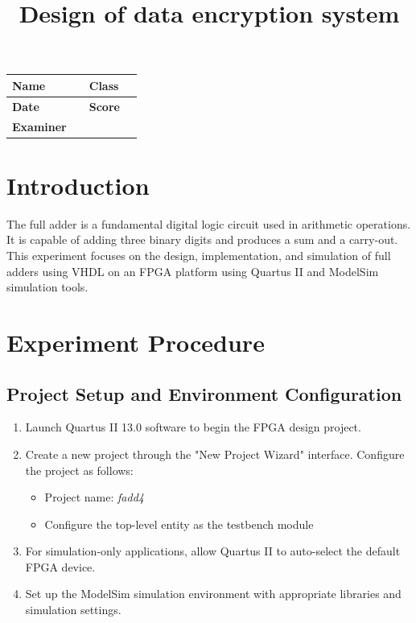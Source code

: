 \documentclass[]{article}
\begin{document}
\title{\huge Design of data encryption system}
\author{\large }
\date{}

\maketitle

\vspace{3cm}

\begin{center}
    {\large
        \begin{tabular}{|p{2.5cm}|p{3.5cm}|p{2.5cm}|p{3.5cm}|}
            \hline
            \textbf{Name}     &  & \textbf{Class} &       \\[0.8cm]
            \hline
            \textbf{Date}     &  & \textbf{Score} & \quad \\[0.8cm]
            \hline
            \textbf{Examiner} &  & \quad          & \quad \\[0.8cm]
            \hline
        \end{tabular}
    }
\end{center}

\newpage
\tableofcontents
\newpage

\section{Introduction}
The full adder is a fundamental digital logic circuit used in arithmetic operations. It is capable of adding three binary digits and produces a sum and a carry-out. This experiment focuses on the design, implementation, and simulation of full adders using VHDL on an FPGA platform using Quartus II and ModelSim simulation tools.

\section{Experiment Procedure}

\subsection{Project Setup and Environment Configuration}
\begin{enumerate}[label = (\arabic*)]
    \item Launch Quartus II 13.0 software to begin the FPGA design project.
    \item Create a new project through the "New Project Wizard" interface. Configure the project as follows:
          \begin{itemize}
              \item Project name: \textit{fadd4}
              \item Configure the top-level entity as the testbench module
          \end{itemize}
    \item For simulation-only applications, allow Quartus II to auto-select the default FPGA device.
    \item Set up the ModelSim simulation environment with appropriate libraries and simulation settings.
\end{enumerate}
\end{document}
